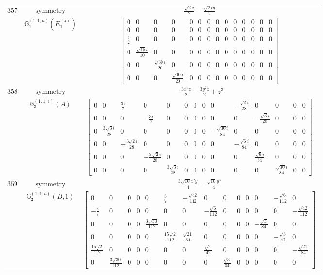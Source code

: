 \documentclass[fleqn,8pt,landscape]{jsarticle}
\begin{document}
\begin{longtable}{ccc}
$ 357 $ & $ \text{symmetry} $ & $ \frac{\sqrt{2} x}{2} - \frac{\sqrt{2} i y}{2} $ \\
$  $ & $ \mathbb{G}_{1}^{(1,1;a)}(E_{1}^{(b)}) $ & $ \begin{bmatrix} 0 & 0 & 0 & 0 & 0 & 0 & 0 & 0 & 0 & 0 & 0 & 0 & 0 & 0 \\ 0 & 0 & 0 & 0 & 0 & 0 & 0 & 0 & 0 & 0 & 0 & 0 & 0 & 0 \\ \frac{i}{2} & 0 & 0 & 0 & 0 & 0 & 0 & 0 & 0 & 0 & 0 & 0 & 0 & 0 \\ 0 & \frac{\sqrt{15} i}{10} & 0 & 0 & 0 & 0 & 0 & 0 & 0 & 0 & 0 & 0 & 0 & 0 \\ 0 & 0 & \frac{\sqrt{30} i}{20} & 0 & 0 & 0 & 0 & 0 & 0 & 0 & 0 & 0 & 0 & 0 \\ 0 & 0 & 0 & \frac{\sqrt{10} i}{20} & 0 & 0 & 0 & 0 & 0 & 0 & 0 & 0 & 0 & 0 \end{bmatrix} $ \\ \hline
$ 358 $ & $ \text{symmetry} $ & $ - \frac{3 x^{2} z}{2} - \frac{3 y^{2} z}{2} + z^{3} $ \\
$  $ & $ \mathbb{G}_{3}^{(1,1;a)}(A) $ & $ \begin{bmatrix} 0 & 0 & \frac{3 i}{7} & 0 & 0 & 0 & 0 & 0 & 0 & - \frac{\sqrt{3} i}{28} & 0 & 0 & 0 & 0 \\ 0 & 0 & 0 & - \frac{3 i}{7} & 0 & 0 & 0 & 0 & 0 & 0 & - \frac{\sqrt{3} i}{28} & 0 & 0 & 0 \\ 0 & \frac{3 \sqrt{3} i}{28} & 0 & 0 & 0 & 0 & 0 & 0 & - \frac{\sqrt{30} i}{84} & 0 & 0 & 0 & 0 & 0 \\ 0 & 0 & - \frac{3 \sqrt{2} i}{28} & 0 & 0 & 0 & 0 & 0 & 0 & - \frac{\sqrt{6} i}{84} & 0 & 0 & 0 & 0 \\ 0 & 0 & 0 & - \frac{3 \sqrt{2} i}{28} & 0 & 0 & 0 & 0 & 0 & 0 & \frac{\sqrt{6} i}{84} & 0 & 0 & 0 \\ 0 & 0 & 0 & 0 & \frac{3 \sqrt{3} i}{28} & 0 & 0 & 0 & 0 & 0 & 0 & \frac{\sqrt{30} i}{84} & 0 & 0 \end{bmatrix} $ \\ \hline
$ 359 $ & $ \text{symmetry} $ & $ \frac{3 \sqrt{10} x^{2} y}{4} - \frac{\sqrt{10} y^{3}}{4} $ \\
$  $ & $ \mathbb{G}_{3}^{(1,1;a)}(B,1) $ & $ \begin{bmatrix} 0 & 0 & 0 & 0 & 0 & \frac{3}{7} & - \frac{\sqrt{42}}{112} & 0 & 0 & 0 & 0 & 0 & - \frac{\sqrt{6}}{112} & 0 \\ - \frac{3}{7} & 0 & 0 & 0 & 0 & 0 & 0 & - \frac{\sqrt{6}}{112} & 0 & 0 & 0 & 0 & 0 & - \frac{\sqrt{42}}{112} \\ 0 & 0 & 0 & 0 & \frac{3 \sqrt{30}}{112} & 0 & 0 & 0 & 0 & 0 & 0 & - \frac{\sqrt{3}}{84} & 0 & 0 \\ 0 & 0 & 0 & 0 & 0 & \frac{15 \sqrt{2}}{112} & \frac{\sqrt{21}}{84} & 0 & 0 & 0 & 0 & 0 & - \frac{\sqrt{3}}{42} & 0 \\ \frac{15 \sqrt{2}}{112} & 0 & 0 & 0 & 0 & 0 & 0 & \frac{\sqrt{3}}{42} & 0 & 0 & 0 & 0 & 0 & - \frac{\sqrt{21}}{84} \\ 0 & \frac{3 \sqrt{30}}{112} & 0 & 0 & 0 & 0 & 0 & 0 & \frac{\sqrt{3}}{84} & 0 & 0 & 0 & 0 & 0 \end{bmatrix} $ \\ \hline

\end{longtable}
\end{document}
